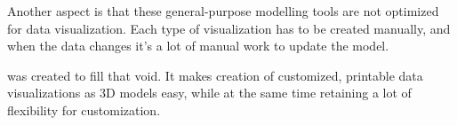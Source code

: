 Another aspect is that these general-purpose modelling tools are not optimized
for data visualization. Each type of visualization has to be created manually,
and when the data changes it's a lot of manual work to update the model.

\tangible{} was created to fill that void. It makes creation of customized,
printable data visualizations as 3D models easy, while at the same time
retaining a lot of flexibility for customization.
